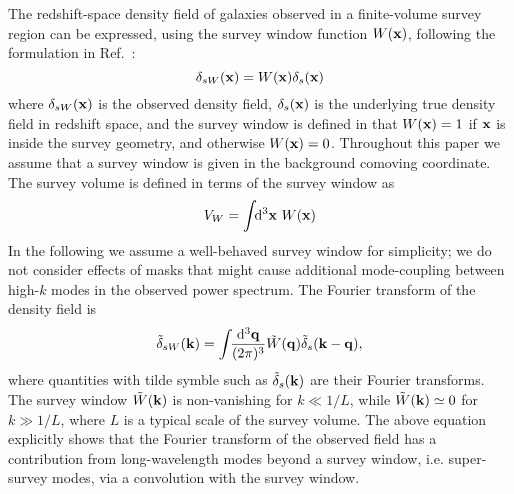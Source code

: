 \documentclass[prd,onecolumn,notitlepage,amsmath,amssymb,floatfix,superscriptaddress]{revtex4-1}
\newcommand{\bx}{{\bf x}}
\newcommand{\bk}{{\bf k}}
\newcommand{\bq}{{\bf q}}
\newcommand{\tdelta}{\tilde{\delta}}
\newcommand{\tW}{\tilde{W}}
\begin{document}
The redshift-space density field of galaxies observed in a finite-volume survey region can be expressed, using 
the survey window function $W(\bx)$, following the formulation in Ref.~\cite{TakadaHu:13}:
%
\begin{equation}
\delta_{sW}(\bx)=W(\bx)\delta_{s}(\bx)
\end{equation}
%
where $\delta_{sW}(\bx)$ is the observed density field, $\delta_s(\bx)$ is the underlying true density field in redshift space, and 
the survey window is defined in that 
$W(\bx)=1$ if $\bx$ is inside the survey geometry, and otherwise $W(\bx)=0$. 
Throughout this paper 
we assume that a survey window is given in the background comoving coordinate.  
The survey volume is defined in terms of the survey window as
%
\begin{equation}
V_W=\int\!\!\mathrm{d}^3\bx~ W(\bx)
\end{equation}
%
In the following we assume a well-behaved survey window for simplicity; we do not consider effects of masks 
that might cause
additional mode-coupling between high-$k$ modes in the observed power spectrum. 
The Fourier transform of the density field is 
%
\begin{equation}
\tdelta_{sW}(\bk)=\int\!\!\frac{\mathrm{d}^3\bq}{(2\pi)^3}\tW(\bq)\tdelta_s(\bk-\bq),
\end{equation}
%
where quantities with tilde symble such as $\tdelta_s(\bk)$ are their Fourier transforms. 
The survey window $\tW(\bk)$ is non-vanishing for $k\ll 1/L$, while $\tW(\bk)\simeq 0$ for $k\gg 1/L$, 
where $L$ is a typical scale of the survey volume. 
The above equation explicitly shows that the Fourier transform of the observed field 
has a contribution from long-wavelength modes 
beyond a survey window, i.e. super-survey modes, via 
 a convolution with the survey window.
\end{document}
